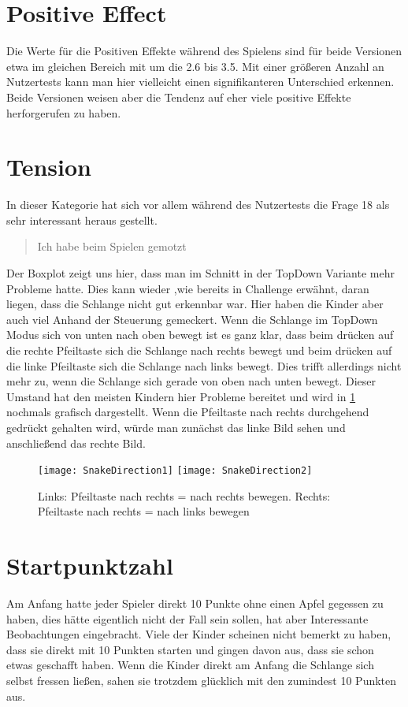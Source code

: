 \section{Positive Effect}
\label{sec:poseffDisk}
Die Werte für die Positiven Effekte während des Spielens sind für beide Versionen etwa im gleichen Bereich mit um die 2.6 bis 3.5. Mit einer größeren Anzahl an Nutzertests kann man hier vielleicht einen signifikanteren Unterschied erkennen. Beide Versionen weisen aber die Tendenz auf eher viele positive Effekte herforgerufen zu haben.
\section{Tension}
\label{sec:tensionDisk}
In dieser Kategorie hat sich vor allem während des Nutzertests die Frage 18 als sehr interessant heraus gestellt.
\begin{quote}
Ich habe beim Spielen gemotzt
\end{quote}
Der Boxplot zeigt uns hier, dass man im Schnitt in der TopDown Variante mehr Probleme hatte. Dies kann wieder ,wie bereits in Challenge erwähnt, daran liegen, dass die Schlange nicht gut erkennbar war. Hier haben die Kinder aber auch viel Anhand der Steuerung gemeckert. Wenn die Schlange im TopDown Modus sich von unten nach oben bewegt ist es ganz klar, dass beim drücken auf die rechte Pfeiltaste sich die Schlange nach rechts bewegt und beim drücken auf die linke Pfeiltaste sich die Schlange nach links bewegt. Dies trifft allerdings nicht mehr zu, wenn die Schlange sich gerade von oben nach unten bewegt. Dieser Umstand hat den meisten Kindern hier Probleme bereitet und wird in \ref{fig:controlIssue} nochmals grafisch dargestellt. Wenn die Pfeiltaste nach rechts durchgehend gedrückt gehalten wird, würde man zunächst das linke Bild sehen und anschließend das rechte Bild.
\begin{figure}[htb]
	\centering
	\texttt{[image: SnakeDirection1]}
	\texttt{[image: SnakeDirection2]}
	\caption{Links: Pfeiltaste nach rechts = nach rechts bewegen. Rechts: Pfeiltaste nach rechts = nach links bewegen\label{fig:controlIssue}}
\end{figure}
\section{Startpunktzahl}
\label{sec:startpointsDisk}
Am Anfang hatte jeder Spieler direkt 10 Punkte ohne einen Apfel gegessen zu haben, dies hätte eigentlich nicht der Fall sein sollen, hat aber Interessante Beobachtungen eingebracht. Viele der Kinder scheinen nicht bemerkt zu haben, dass sie direkt mit 10 Punkten starten und gingen davon aus, dass sie schon etwas geschafft haben. Wenn die Kinder direkt am Anfang die Schlange sich selbst fressen ließen, sahen sie trotzdem glücklich mit den zumindest 10 Punkten aus.
